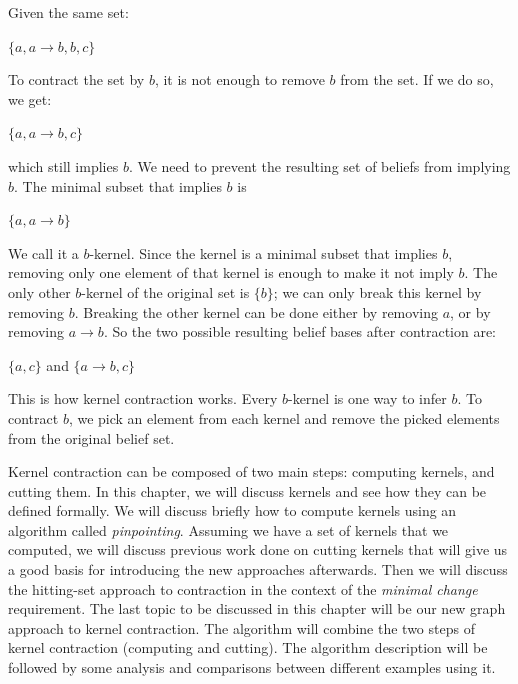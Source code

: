 Given the same set:
\begin{center}
$ \lbrace a, a \rightarrow b, b, c \rbrace $
\end{center}
To contract the set by $b$, it is not enough to remove $b$ from the set. If we do so, we get:
\begin{center}
$ \lbrace a, a \rightarrow b, c \rbrace $
\end{center}
which still implies $b$. We need to prevent the resulting set of beliefs from implying $b$. The minimal subset that implies $b$ is 
\begin{center}
$ \lbrace a, a \rightarrow b \rbrace $
\end{center}
We call it a $b$-kernel. Since the kernel is a minimal subset that implies $b$, removing only one element of that kernel is enough to make it not imply $b$. The only other $b$-kernel of the original set is $\lbrace b \rbrace$; we can only break this kernel by removing $b$. Breaking the other kernel can be done either by removing $a$, or by removing $a \rightarrow b$. So the two possible resulting belief bases after contraction are:
\begin{center}
$ \lbrace a, c \rbrace $ and $ \lbrace a \rightarrow b, c \rbrace $
\end{center}
This is how kernel contraction works. Every $b$-kernel is one way to infer $b$. To contract $b$, we pick an element from each kernel and remove the picked elements from the original belief set.

Kernel contraction can be composed of two main steps: computing kernels, and cutting them. In this chapter, we will discuss kernels and see how they can be defined formally. We will discuss briefly how to compute kernels using an algorithm called \textit{pinpointing}. Assuming we have a set of kernels that we computed, we will discuss previous work done on cutting kernels that will give us a good basis for introducing the new approaches afterwards. Then we will discuss the hitting-set approach to contraction in the context of the \textit{minimal change} requirement. The last topic to be discussed in this chapter will be our new graph approach to kernel contraction. The algorithm will combine the two steps of kernel contraction (computing and cutting). The algorithm description will be followed by some analysis and comparisons between different examples using it.


